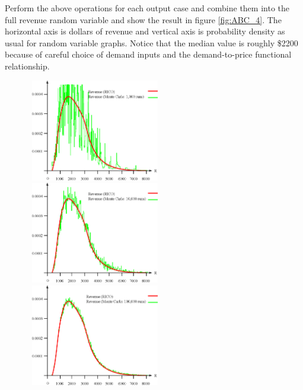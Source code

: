 Perform the above operations for each output case and combine them into the full revenue random variable and show the result in figure \ref{fig:ABC_4}. The horizontal axis is dollars of revenue and vertical axis is probability density as usual for random variable graphs. Notice that the median value is roughly \$2200 because of careful choice of demand inputs and the demand-to-price functional relationship. 


\begin{figure}[ht]
\begin{minipage}[b]{0.5\linewidth}
\centering
\includegraphics[width=2.33in, height=1.75in]{Images/ABC_1K}
\end{minipage}
\begin{minipage}[b]{0.5\linewidth}
\centering
\includegraphics[width=2.33in, height=1.75in]{Images/ABC_10K}
\end{minipage}
\begin{minipage}[b]{0.5\linewidth}
\centering
\includegraphics[width=2.33in, height=1.75in]{Images/ABC_100K}
\end{minipage}
\begin{minipage}[b]{0.5\linewidth}

\end{minipage}
\end{figure}
